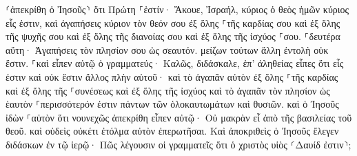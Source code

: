\documentclass{openreader}
\begin{document}
⸂ἀπεκρίθη ὁ Ἰησοῦς⸃ ὅτι Πρώτη ⸀ἐστίν· Ἄκουε, Ἰσραήλ, κύριος ὁ θεὸς ἡμῶν κύριος εἷς ἐστιν, 
καὶ ἀγαπήσεις κύριον τὸν θεόν σου ἐξ ὅλης ⸀τῆς καρδίας σου καὶ ἐξ ὅλης τῆς ψυχῆς σου καὶ ἐξ ὅλης τῆς διανοίας σου καὶ ἐξ ὅλης τῆς ἰσχύος ⸀σου. 
⸀δευτέρα αὕτη· Ἀγαπήσεις τὸν πλησίον σου ὡς σεαυτόν. μείζων τούτων ἄλλη ἐντολὴ οὐκ ἔστιν. 
⸀καὶ εἶπεν αὐτῷ ὁ γραμματεύς· Καλῶς, διδάσκαλε, ἐπ’ ἀληθείας εἶπες ὅτι εἷς ἐστιν καὶ οὐκ ἔστιν ἄλλος πλὴν αὐτοῦ· 
καὶ τὸ ἀγαπᾶν αὐτὸν ἐξ ὅλης ⸀τῆς καρδίας καὶ ἐξ ὅλης τῆς ⸀συνέσεως καὶ ἐξ ὅλης τῆς ἰσχύος καὶ τὸ ἀγαπᾶν τὸν πλησίον ὡς ἑαυτὸν ⸀περισσότερόν ἐστιν πάντων τῶν ὁλοκαυτωμάτων καὶ θυσιῶν. 
καὶ ὁ Ἰησοῦς ἰδὼν ⸀αὐτὸν ὅτι νουνεχῶς ἀπεκρίθη εἶπεν αὐτῷ· Οὐ μακρὰν εἶ ἀπὸ τῆς βασιλείας τοῦ θεοῦ. καὶ οὐδεὶς οὐκέτι ἐτόλμα αὐτὸν ἐπερωτῆσαι. 
Καὶ ἀποκριθεὶς ὁ Ἰησοῦς ἔλεγεν διδάσκων ἐν τῷ ἱερῷ· Πῶς λέγουσιν οἱ γραμματεῖς ὅτι ὁ χριστὸς υἱὸς ⸂Δαυίδ ἐστιν⸃; 
\end{document}
